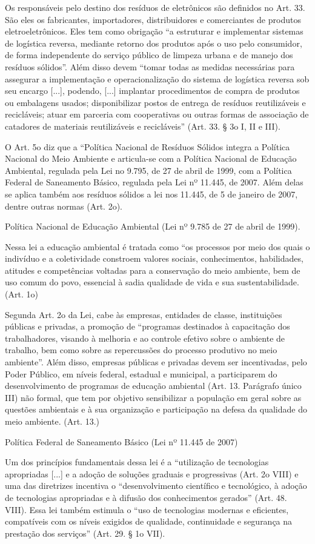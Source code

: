 Os responsáveis pelo destino dos resíduos de eletrônicos são definidos no Art. 33. São eles os fabricantes, importadores, distribuidores e comerciantes de produtos eletroeletrônicos. Eles tem como obrigação “a estruturar e implementar sistemas de logística reversa, mediante retorno dos produtos após o uso pelo consumidor, de forma independente do serviço público de limpeza urbana e de manejo dos resíduos sólidos”. Além disso devem “tomar todas as medidas necessárias para assegurar a implementação e operacionalização do sistema de logística reversa sob seu encargo [...], podendo, [...] implantar procedimentos de compra de produtos ou embalagens usados; disponibilizar postos de entrega de resíduos reutilizáveis e recicláveis; atuar em parceria com cooperativas ou outras formas de associação de catadores de materiais reutilizáveis e recicláveis” (Art. 33. § 3o I, II e III).

O Art. 5o diz que a “Política Nacional de Resíduos Sólidos integra a Política Nacional do Meio Ambiente e articula-se com a Política Nacional de Educação Ambiental, regulada pela Lei no 9.795, de 27 de abril de 1999, com a Política Federal de Saneamento Básico, regulada pela Lei nº 11.445, de 2007. Além delas se aplica também aos resíduos sólidos a lei nos 11.445, de 5 de janeiro de 2007, dentre outras normas (Art. 2o).

Política Nacional de Educação Ambiental (Lei nº 9.785 de 27 de abril de 1999). 

Nessa lei a educação ambiental é tratada como “os processos por meio dos quais o indivíduo e a coletividade constroem valores sociais, conhecimentos, habilidades, atitudes e competências voltadas para a conservação do meio ambiente, bem de uso comum do povo, essencial à sadia qualidade de vida e sua sustentabilidade. (Art. 1o)

Segunda Art. 2o da Lei, cabe às empresas, entidades de classe, instituições públicas e privadas, a promoção de “programas destinados à capacitação dos trabalhadores, visando à melhoria e ao controle efetivo sobre o ambiente de trabalho, bem como sobre as repercussões do processo produtivo no meio ambiente”. Além disso, empresas públicas e privadas devem ser incentivadas, pelo Poder Público, em níveis federal, estadual e municipal, a participarem do desenvolvimento de programas de educação ambiental (Art. 13. Parágrafo único III) não formal, que tem por objetivo sensibilizar a população em geral sobre as questões ambientais e à sua organização e participação na defesa da qualidade do meio ambiente. (Art. 13.)

Política Federal de Saneamento Básico (Lei nº 11.445 de 2007)

Um dos princípios fundamentais dessa lei é a “utilização de tecnologias apropriadas [...] e a adoção de soluções graduais e progressivas (Art. 2o  VIII) e uma das diretrizes incentiva o “desenvolvimento científico e tecnológico, à adoção de tecnologias apropriadas e à difusão dos conhecimentos gerados” (Art. 48. VIII). Essa lei também estimula o “uso de tecnologias modernas e eficientes, compatíveis com os níveis exigidos de qualidade, continuidade e segurança na prestação dos serviços” (Art. 29.  § 1o  VII).